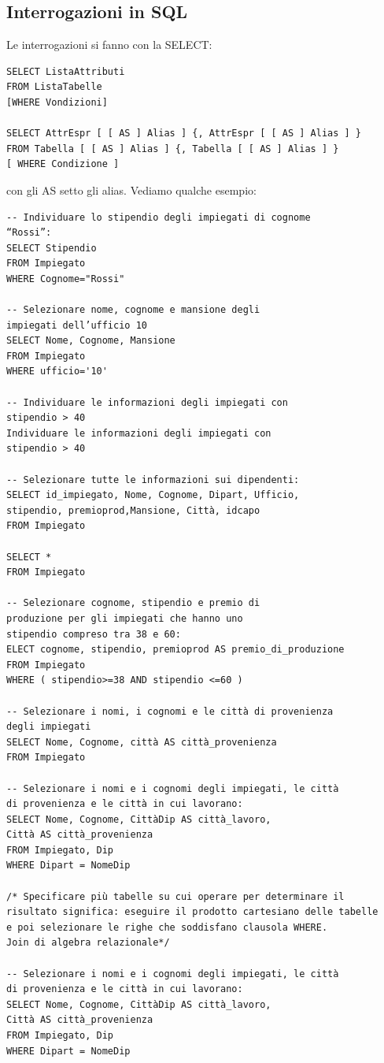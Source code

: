 \documentclass[a4paper,12pt, oneside]{book}
\begin{document}
\subsection{Interrogazioni in SQL}
Le interrogazioni si fanno con la SELECT:
\begin{verbatim}
SELECT ListaAttributi
FROM ListaTabelle
[WHERE Vondizioni] 

SELECT AttrEspr [ [ AS ] Alias ] {, AttrEspr [ [ AS ] Alias ] }
FROM Tabella [ [ AS ] Alias ] {, Tabella [ [ AS ] Alias ] }
[ WHERE Condizione ]
\end{verbatim} 
con gli AS setto gli alias.
Vediamo qualche esempio:
\begin{verbatim}
-- Individuare lo stipendio degli impiegati di cognome
“Rossi”:
SELECT Stipendio
FROM Impiegato
WHERE Cognome="Rossi"

-- Selezionare nome, cognome e mansione degli
impiegati dell’ufficio 10
SELECT Nome, Cognome, Mansione
FROM Impiegato
WHERE ufficio='10'

-- Individuare le informazioni degli impiegati con
stipendio > 40
Individuare le informazioni degli impiegati con
stipendio > 40

-- Selezionare tutte le informazioni sui dipendenti:
SELECT id_impiegato, Nome, Cognome, Dipart, Ufficio,
stipendio, premioprod,Mansione, Città, idcapo
FROM Impiegato

SELECT *
FROM Impiegato

-- Selezionare cognome, stipendio e premio di
produzione per gli impiegati che hanno uno
stipendio compreso tra 38 e 60:
ELECT cognome, stipendio, premioprod AS premio_di_produzione
FROM Impiegato
WHERE ( stipendio>=38 AND stipendio <=60 )

-- Selezionare i nomi, i cognomi e le città di provenienza
degli impiegati
SELECT Nome, Cognome, città AS città_provenienza
FROM Impiegato

-- Selezionare i nomi e i cognomi degli impiegati, le città
di provenienza e le città in cui lavorano:
SELECT Nome, Cognome, CittàDip AS città_lavoro,
Città AS città_provenienza
FROM Impiegato, Dip
WHERE Dipart = NomeDip

/* Specificare più tabelle su cui operare per determinare il
risultato significa: eseguire il prodotto cartesiano delle tabelle
e poi selezionare le righe che soddisfano clausola WHERE. 
Join di algebra relazionale*/

-- Selezionare i nomi e i cognomi degli impiegati, le città
di provenienza e le città in cui lavorano:
SELECT Nome, Cognome, CittàDip AS città_lavoro,
Città AS città_provenienza
FROM Impiegato, Dip
WHERE Dipart = NomeDip


\end{verbatim}
\end{document}
